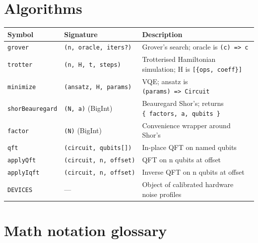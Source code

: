 \documentclass[
  11pt,
  letterpaper,
  oneside]{scrbook}
\begin{document}
\section*{Algorithms}\label{algorithms-1}


\begin{longtable}[]{@{}
  >{\raggedright\arraybackslash}p{}
  >{\raggedright\arraybackslash}p{}
  >{\raggedright\arraybackslash}p{}@{}}
\toprule\noalign{}
\begin{minipage}[b]{\linewidth}\raggedright
Symbol
\end{minipage} & \begin{minipage}[b]{\linewidth}\raggedright
Signature
\end{minipage} & \begin{minipage}[b]{\linewidth}\raggedright
Description
\end{minipage} \\
\midrule\noalign{}
\endhead
\bottomrule\noalign{}
\endlastfoot
\texttt{grover} & \texttt{(n,\ oracle,\ iters?)} & Grover's search;
oracle is \texttt{(c)\ =\textgreater{}\ c} \\
\texttt{trotter} & \texttt{(n,\ H,\ t,\ steps)} & Trotterised
Hamiltonian simulation; H is \texttt{{[}\{ops,\ coeff\}{]}} \\
\texttt{minimize} & \texttt{(ansatz,\ H,\ params)} & VQE; ansatz is
\texttt{(params)\ =\textgreater{}\ Circuit} \\
\texttt{shorBeauregard} & \texttt{(N,\ a)} (BigInt) & Beauregard Shor's;
returns \texttt{\{\ factors,\ a,\ qubits\ \}} \\
\texttt{factor} & \texttt{(N)} (BigInt) & Convenience wrapper around
Shor's \\
\texttt{qft} & \texttt{(circuit,\ qubits{[}{]})} & In-place QFT on named
qubits \\
\texttt{applyQft} & \texttt{(circuit,\ n,\ offset)} & QFT on n qubits at
offset \\
\texttt{applyIqft} & \texttt{(circuit,\ n,\ offset)} & Inverse QFT on n
qubits at offset \\
\texttt{DEVICES} & --- & Object of calibrated hardware noise profiles \\
\end{longtable}

\section*{Math notation glossary}\label{math-notation-glossary}
\end{document}
